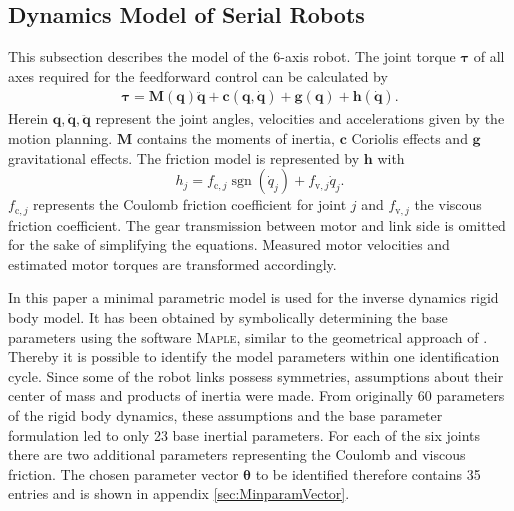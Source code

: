\subsection{Dynamics Model of Serial Robots}
This subsection describes the model of the 6-axis robot. The joint torque $\boldsymbol{\tau}$ of all axes required for the feedforward control can be calculated by
\begin{equation}
\label{eq:model_equation1}
\begin{split}
\boldsymbol{\tau}=
\boldsymbol{M}(\boldsymbol{q}) \ddot{\boldsymbol{q}}+\boldsymbol{c}(\boldsymbol{q}, \dot{\boldsymbol{q}})+\boldsymbol{g}(\boldsymbol{q})+\boldsymbol{h}(\dot{\boldsymbol{q}}).
\end{split}
\end{equation}
Herein $\boldsymbol{q}, \dot{\boldsymbol{q}}, \ddot{\boldsymbol{q}}$ represent the joint angles, velocities and accelerations given by the motion planning. $\boldsymbol{M}$ contains the moments of inertia, $\boldsymbol{c}$ Coriolis effects and $\boldsymbol{g}$ gravitational effects. The friction model is represented by $\boldsymbol{h}$ with
\begin{equation}
h_{j}=f_{\mathrm{c}, j} \operatorname{sgn}\left(\dot{{q}}_{j}\right)+f_{\mathrm{v}, j} \dot{q}_{j}.
\end{equation}
$f_{\mathrm{c}, j}$ represents the Coulomb friction coefficient for joint $j$ and $f_{\mathrm{v}, j}$ the viscous friction coefficient. The gear transmission between motor and link side is omitted for the sake of simplifying the equations. Measured motor velocities and estimated motor torques are transformed accordingly.

In this paper a minimal parametric model is used for the inverse dynamics rigid body model. 
It has been obtained by symbolically determining the base parameters using the software \textsc{Maple}, similar to the geometrical approach of \cite{Khalil.2006}.
Thereby it is possible to identify the model parameters within one identification cycle.
Since some of the robot links possess symmetries, assumptions about their center of mass and products of inertia were made. From originally 60  parameters of the rigid body dynamics, these assumptions and the base parameter formulation led to only 23 base inertial parameters. For each of the six joints there are two additional parameters representing the Coulomb and viscous friction. The chosen parameter vector $\boldsymbol{\theta}$ to be identified therefore contains 35 entries and is shown in appendix \ref{sec:MinparamVector}.